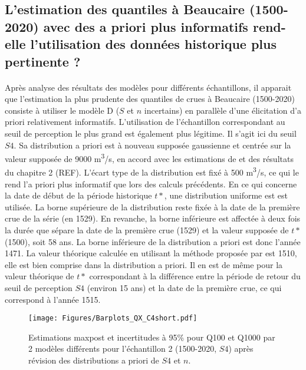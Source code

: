 \documentclass[11pt]{article}
\begin{document}
	 \subsection{L'estimation des quantiles à Beaucaire (1500-2020) avec des a priori plus informatifs rend-elle l'utilisation des données historique plus pertinente ?}


	\paragraph{} Après analyse des résultats des modèles pour différents échantillons, il apparait que l'estimation la plus prudente des quantiles de crues à Beaucaire (1500-2020) consiste à utiliser le modèle D ($S$ et $n$ incertains) en parallèle d'une élicitation d'a priori relativement informatifs. L'utilisation de l'échantillon correspondant au seuil de perception le plus grand est également plus légitime. Il s'agit ici du seuil $S4$. Sa distribution a priori est à nouveau supposée gaussienne et centrée sur la valeur supposée de 9000 m\textsuperscript{3}/s, en accord avec les estimations de \citet{pichard_hydro-climatology_2017} et des résultats du chapitre 2 (REF). L'écart type de la distribution est fixé à 500 m\textsuperscript{3}/s, ce qui le rend l'a priori plus informatif que lors des calculs précédents. En ce qui concerne la date de début de la période historique $t*$, une distribution uniforme est est utilisée. La borne supérieure de la distribution reste fixée à la date de la première crue de la série (en 1529). En revanche, la borne inférieure est affectée à deux fois la durée que sépare la date de la première crue (1529) et la valeur supposée de $t*$ (1500), soit 58 ans. La borne inférieure de la distribution a priori est donc l'année 1471. La valeur théorique calculée en utilisant la méthode proposée par \citet{prosdocimi_german_2018} est 1510, elle est bien comprise dans la distribution a priori. Il en est de même pour la valeur théorique de $t*$ correspondant à la différence entre la période de retour du seuil de perception $S4$ (environ 15 ans) et la date de la première crue, ce qui correspond à l'année 1515.

	\begin{figure}[h]
		\centering
		\texttt{[image: Figures/Barplots\_QX\_C4short.pdf]}
		\caption{Estimations maxpost et incertitudes à 95\% pour Q100 et Q1000 par 2 modèles différents pour l'échantillon 2 (1500-2020, $S4$) après révision des distributions a priori de $S4$ et $n$.}
		\label{fig:BarplotC4short}
	\end{figure}
\end{document}
